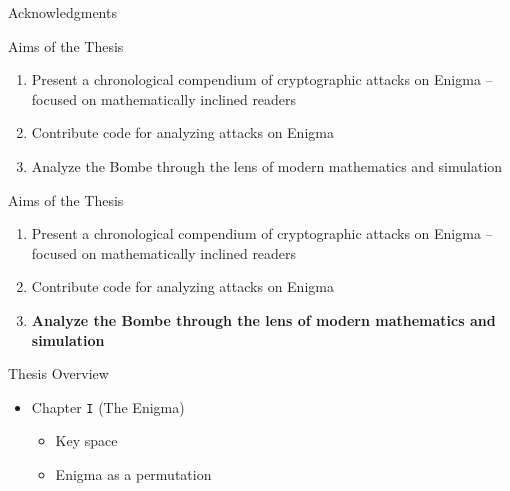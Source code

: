 \documentclass[hyphens,aspectratio=169]{beamer}
\begin{document}
\begin{frame}[fragile]{Acknowledgments}
\end{frame}

\begin{frame}[fragile]{Aims of the Thesis}
	\begin{enumerate}
		\item Present a chronological compendium of cryptographic attacks on Enigma -- focused on mathematically inclined readers
		      \pause
		      \vspace{5mm}
		\item Contribute code for analyzing attacks on Enigma
		      \pause
		      \vspace{5mm}

		\item Analyze the Bombe through the lens of modern mathematics and simulation
	\end{enumerate}
\end{frame}

\begin{frame}[fragile]{Aims of the Thesis}
	\begin{enumerate}
		\item Present a chronological compendium of cryptographic attacks on Enigma -- focused on mathematically inclined readers
		      \vspace{5mm}
		\item Contribute code for analyzing attacks on Enigma
		      \vspace{5mm}

		\item {\bf{Analyze the Bombe through the lens of modern mathematics and simulation}}
	\end{enumerate}
\end{frame}

\begin{frame}[fragile]{Thesis Overview}
	\begin{itemize}
		\item Chapter \texttt{I} (The Enigma)
		      \begin{itemize}
			      \item Key space
			      \item Enigma as a permutation
		      \end{itemize}
	\end{itemize}

\end{frame}
\end{document}
